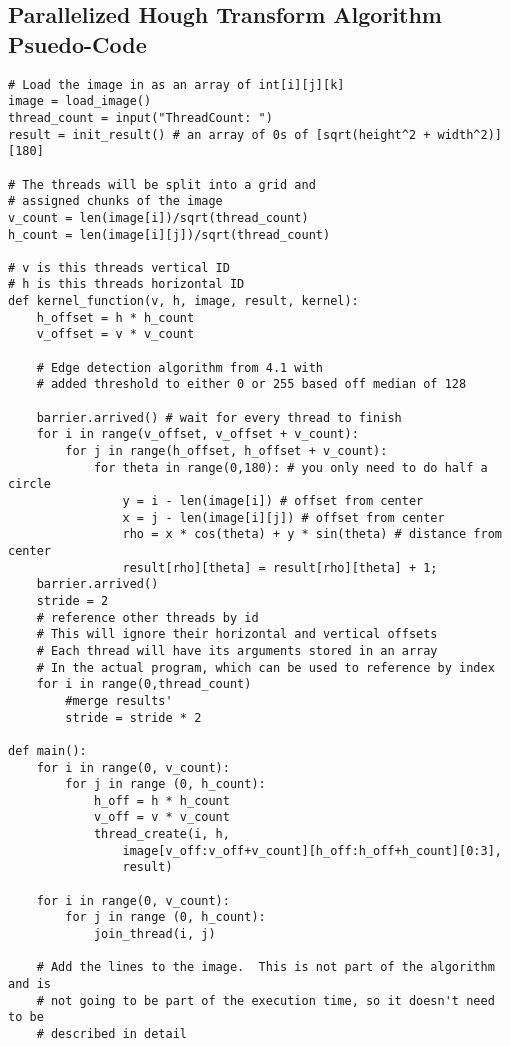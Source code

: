 \documentclass{article}
\begin{document}
        \subsection{Parallelized Hough Transform Algorithm Psuedo-Code}
        \begin{lstlisting}
# Load the image in as an array of int[i][j][k]
image = load_image()
thread_count = input("ThreadCount: ")
result = init_result() # an array of 0s of [sqrt(height^2 + width^2)][180]

# The threads will be split into a grid and 
# assigned chunks of the image
v_count = len(image[i])/sqrt(thread_count)
h_count = len(image[i][j])/sqrt(thread_count)

# v is this threads vertical ID
# h is this threads horizontal ID
def kernel_function(v, h, image, result, kernel):
    h_offset = h * h_count
    v_offset = v * v_count

    # Edge detection algorithm from 4.1 with
    # added threshold to either 0 or 255 based off median of 128
    
    barrier.arrived() # wait for every thread to finish
    for i in range(v_offset, v_offset + v_count):
        for j in range(h_offset, h_offset + v_count):
            for theta in range(0,180): # you only need to do half a circle
                y = i - len(image[i]) # offset from center
                x = j - len(image[i][j]) # offset from center
                rho = x * cos(theta) + y * sin(theta) # distance from center
                result[rho][theta] = result[rho][theta] + 1;
    barrier.arrived()
    stride = 2
    # reference other threads by id
    # This will ignore their horizontal and vertical offsets
    # Each thread will have its arguments stored in an array
    # In the actual program, which can be used to reference by index
    for i in range(0,thread_count)
        #merge results'
        stride = stride * 2

def main():
    for i in range(0, v_count):
        for j in range (0, h_count):
            h_off = h * h_count
            v_off = v * v_count
            thread_create(i, h, 
                image[v_off:v_off+v_count][h_off:h_off+h_count][0:3], 
                result)
                
    for i in range(0, v_count):
        for j in range (0, h_count):
            join_thread(i, j)
            
    # Add the lines to the image.  This is not part of the algorithm and is
    # not going to be part of the execution time, so it doesn't need to be
    # described in detail
        \end{lstlisting}
        \pagebreak       
        
\end{document}
